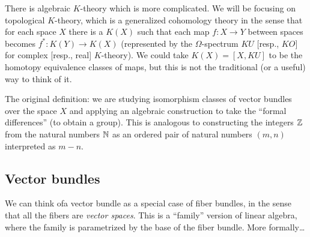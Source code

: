 
\lecture[K-Theory]{}

\begin{node}
There is algebraic $K$-theory which is more complicated. We will be
focusing on topological $K$-theory, which is a generalized cohomology
theory in the sense that for each space $X$ there is a $K(X)$ such
that each map $f\colon X\to Y$ between spaces becomes $f^{*}\colon K(Y)\to K(X)$
(represented by the $\Omega$-spectrum $KU$ [resp., $KO$] for complex
[resp., real] $K$-theory). We could take $K(X)=[X,KU]$ to be the
homotopy equivalence classes of maps, but this is not the traditional
(or a useful) way to think of it.

The original definition: we are studying isomorphism classes of vector
bundles over the space $X$ and applying an algebraic construction to
take the ``formal differences'' (to obtain a group). This is analogous
to constructing the integers $\mathbb{Z}$ from the natural numbers $\mathbb{N}$ as
an ordered pair of natural numbers $(m,n)$ interpreted as $m-n$.
\end{node}

\subsection{Vector bundles}

\begin{node}
We can think ofa vector bundle as a special case of fiber bundles, in
the sense that all the fibers are \emph{vector spaces}. This is a
``family'' version of linear algebra, where the family is parametrized
by the base of the fiber bundle. More formally\dots
\end{node}

